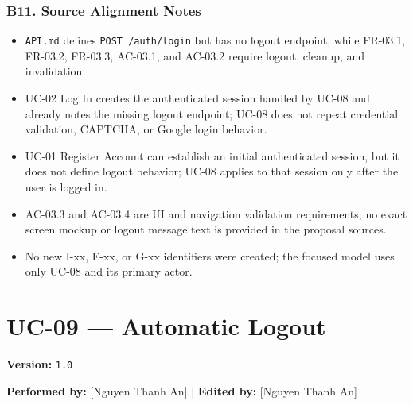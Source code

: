\documentclass[12pt]{article}
\begin{document}
\hypertarget{sec:b11-source-alignment-notes}{}
\subsubsection*{B11. Source Alignment Notes}
\par\medskip

\begin{itemize}
\item \texttt{API.md} defines \texttt{POST /auth/login} but has no logout endpoint, while FR-03.1, FR-03.2, FR-03.3, AC-03.1, and AC-03.2 require logout, cleanup, and invalidation.
\item UC-02 Log In creates the authenticated session handled by UC-08 and already notes the missing logout endpoint; UC-08 does not repeat credential validation, CAPTCHA, or Google login behavior.
\item UC-01 Register Account can establish an initial authenticated session, but it does not define logout behavior; UC-08 applies to that session only after the user is logged in.
\item AC-03.3 and AC-03.4 are UI and navigation validation requirements; no exact screen mockup or logout message text is provided in the proposal sources.
\item No new I-xx, E-xx, or G-xx identifiers were created; the focused model uses only UC-08 and its primary actor.
\end{itemize}
\par\medskip

\pagebreak
\hypertarget{sec:uc-09-automatic-logout}{}
\section*{UC-09 --- Automatic Logout}
\par\medskip

\textbf{Version:} \texttt{1.0}
\par\medskip

\textbf{Performed by:} [Nguyen Thanh An] | \textbf{Edited by:} [Nguyen Thanh An]
\par\medskip
\end{document}
